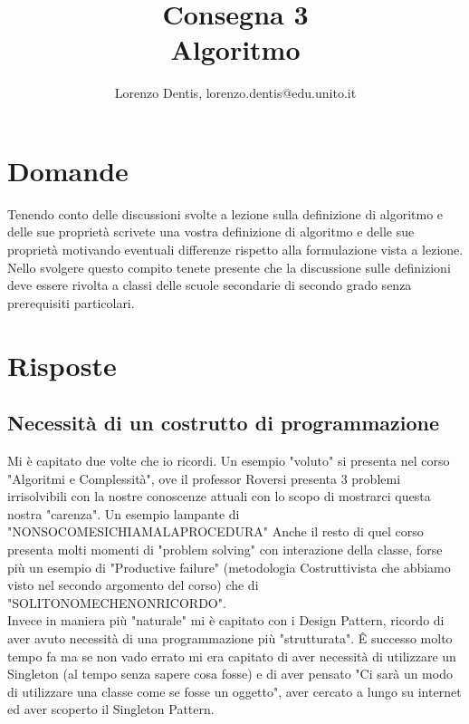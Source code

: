 \documentclass[a4paper]{article}
\begin{document}
\author{Lorenzo Dentis, lorenzo.dentis@edu.unito.it}
\title{Consegna 3 \\ \large Algoritmo}
\maketitle

\section{Domande}
Tenendo conto delle discussioni svolte a lezione sulla definizione di algoritmo e  delle sue proprietà scrivete una vostra definizione di algoritmo e delle sue proprietà motivando eventuali differenze rispetto alla formulazione vista a lezione. Nello svolgere  questo compito tenete presente che la discussione sulle definizioni deve essere rivolta a classi delle scuole secondarie di secondo grado senza prerequisiti particolari.
\section{Risposte}
\subsection{Necessità di un costrutto di programmazione}
Mi è capitato due volte che io ricordi. Un esempio "voluto" si presenta nel corso "Algoritmi e Complessità", ove il professor Roversi presenta 3 problemi irrisolvibili con la nostre conoscenze attuali con lo scopo di mostrarci questa nostra "carenza". Un esempio lampante di "NONSOCOMESICHIAMALAPROCEDURA"
Anche il resto di quel corso presenta molti momenti di "problem solving" con interazione della classe, forse più un esempio di "Productive failure" (metodologia Costruttivista che abbiamo visto nel secondo argomento del corso) che di "SOLITONOMECHENONRICORDO".\\ 
Invece in maniera più "naturale" mi è capitato con i Design Pattern, ricordo di aver avuto necessità di una programmazione più "strutturata". Ê successo molto tempo fa ma se non vado errato mi era capitato di aver necessità di utilizzare un Singleton (al tempo senza sapere cosa fosse) e di aver pensato "Ci sarà un modo di utilizzare una classe come se fosse un oggetto", aver cercato a lungo su internet ed aver scoperto il Singleton Pattern.
\end{document}
